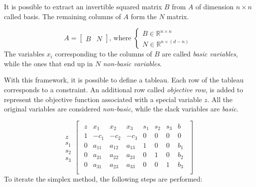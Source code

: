 It is possible to extract an invertible squared matrix $B$ from $A$ of dimension $n \times n$ called basis.
The remaining columns of $A$ form the $N$ matrix.

\begin{equation*}
    A = \begin{bmatrix}
        B & N
    \end{bmatrix}
    \text{, where }
    \begin{cases}
        B \in \mathbb{R}^{n \times n} \\
        N \in \mathbb{R}^{n \times (d - n)}
    \end{cases}
\end{equation*}
The variables $x_i$ corresponding to the columns of $B$ are called \textit{basic variables}, while the ones that end up in $N$ \textit{non-basic variables}.

With this framework, it is possible to define a tableau.
Each row of the tableau corresponds to a constraint.
An additional row called \textit{objective row}, is added to represent the objective function associated with a special variable $z$.
All the original variables are considered \textit{non-basic}, while the slack variables are \textit{basic}.

\begin{equation*}
    \begin{array}{c}
        \\
        z   \\
        s_1 \\
        s_2 \\
        s_3
    \end{array}
    \begin{bmatrix}
        \begin{array}{c|cccccc|c}
            z & x_1    & x_2    & x_3    & s_1 & s_2 & s_3 & b   \\ \hline
            1 & -c_1   & -c_2   & -c_3   & 0   & 0   & 0   & 0   \\ \hline
            0 & a_{11} & a_{12} & a_{13} & 1   & 0   & 0   & b_1 \\
            0 & a_{21} & a_{22} & a_{23} & 0   & 1   & 0   & b_2 \\
            0 & a_{31} & a_{23} & a_{33} & 0   & 0   & 1   & b_3 \\
        \end{array}
    \end{bmatrix}
\end{equation*}
To iterate the simplex method, the following steps are performed:

